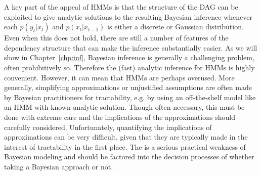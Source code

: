 A key part of the appeal of HMMs is that the structure of the
DAG can be exploited to give analytic solutions to the resulting Bayesian inference whenever each $p(y_t | x_t)$ 
and $p(x_t | x_{t-1})$ is either a discrete or Gaussian distribution. Even when this does not hold, there 
are still a number of features of the dependency structure that can make the inference substantially easier.
As we will show in Chapter~\ref{chp:inf}, Bayesian inference is generally a challenging problem, often prohibitively so.
Therefore the (fast) analytic inference for HMMs is highly convenient.  However, it can mean that HMMs are perhaps overused.
More generally, simplifying approximations or unjustified assumptions are often made by Bayesian practitioners 
for tractability, e.g. by using an off-the-shelf model like an HMM with known analytic solution. Though often necessary, 
this must be done with extreme care and the implications of the approximations should carefully considered.  Unfortunately, 
quantifying the implications of approximations can be very difficult, given that they are typically made in the interest
of tractability in the first place.  The is a serious practical weakness of Bayesian modeling and should be factored 
into the decision processes of whether taking a Bayesian approach or not.  
